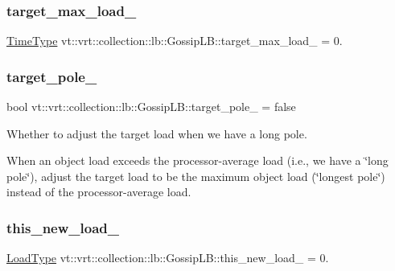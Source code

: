 \subsubsection{\texorpdfstring{target\+\_\+max\+\_\+load\+\_\+}{target\_max\_load\_}}
{\footnotesize\ttfamily \hyperlink{namespacevt_a876a9d0cd5a952859c72de8a46881442}{Time\+Type} vt\+::vrt\+::collection\+::lb\+::\+Gossip\+L\+B\+::target\+\_\+max\+\_\+load\+\_\+ = 0.\hspace{0.3cm}{\ttfamily [private]}}

\mbox{\label{structvt_1_1vrt_1_1collection_1_1lb_1_1_gossip_l_b_ac589aa54ba0a2e1b5d3e28330ba93096}} 
\subsubsection{\texorpdfstring{target\+\_\+pole\+\_\+}{target\_pole\_}}
{\footnotesize\ttfamily bool vt\+::vrt\+::collection\+::lb\+::\+Gossip\+L\+B\+::target\+\_\+pole\+\_\+ = false\hspace{0.3cm}{\ttfamily [private]}}



Whether to adjust the target load when we have a long pole. 

When an object load exceeds the processor-\/average load (i.\+e., we have a \char`\"{}long pole\char`\"{}), adjust the target load to be the maximum object load (\char`\"{}longest pole\char`\"{}) instead of the processor-\/average load. \mbox{\label{structvt_1_1vrt_1_1collection_1_1lb_1_1_gossip_l_b_a0159b2927a9f8874b6eaff32ab2324c7}} 
\subsubsection{\texorpdfstring{this\+\_\+new\+\_\+load\+\_\+}{this\_new\_load\_}}
{\footnotesize\ttfamily \hyperlink{structvt_1_1vrt_1_1collection_1_1lb_1_1_base_l_b_a215e22b9f12678303f49615ae3be05cc}{Load\+Type} vt\+::vrt\+::collection\+::lb\+::\+Gossip\+L\+B\+::this\+\_\+new\+\_\+load\+\_\+ = 0.\hspace{0.3cm}{\ttfamily [private]}}


